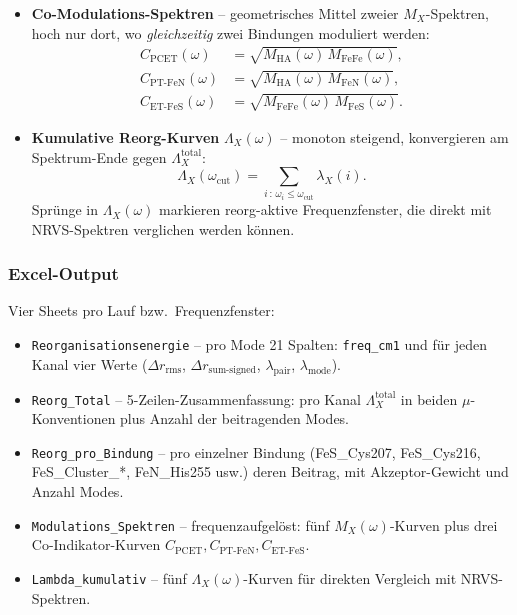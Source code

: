 \documentclass[11pt,a4paper,twoside]{article}
\theoremstyle{remark}
\begin{document}
\begin{itemize}
  \item \textbf{Co-Modulations-Spektren} -- geometrisches Mittel
        zweier $M_X$-Spektren, hoch nur dort, wo \emph{gleichzeitig}
        zwei Bindungen moduliert werden:
        \begin{align}
          C_\text{PCET}(\omega) &= \sqrt{M_\text{HA}(\omega)\, M_\text{FeFe}(\omega)},\\
          C_{\text{PT-FeN}}(\omega) &= \sqrt{M_\text{HA}(\omega)\, M_\text{FeN}(\omega)},\\
          C_{\text{ET-FeS}}(\omega) &= \sqrt{M_\text{FeFe}(\omega)\, M_\text{FeS}(\omega)}.
        \end{align}

  \item \textbf{Kumulative Reorg-Kurven} $\Lambda_X(\omega)$ -- monoton
        steigend, konvergieren am Spektrum-Ende gegen $\Lambda_X^\text{total}$:
        \begin{equation}
          \Lambda_X(\omega_\text{cut})
          = \sum_{i\,:\,\omega_i \le \omega_\text{cut}} \lambda_X(i).
        \end{equation}
        Spr\"unge in $\Lambda_X(\omega)$ markieren reorg-aktive
        Frequenzfenster, die direkt mit NRVS-Spektren verglichen
        werden k\"onnen.
\end{itemize}

\subsubsection*{Excel-Output}
\label{sec:reorg-excel}

Vier Sheets pro Lauf bzw.\ Frequenzfenster:

\begin{itemize}
  \item \texttt{Reorganisationsenergie} -- pro Mode 21 Spalten:
        \texttt{freq\_cm1} und f\"ur jeden Kanal vier Werte
        ($\Delta r_\text{rms}$, $\Delta r_\text{sum-signed}$,
        $\lambda_\text{pair}$, $\lambda_\text{mode}$).

  \item \texttt{Reorg\_Total} -- 5-Zeilen-Zusammenfassung: pro Kanal
        $\Lambda_X^\text{total}$ in beiden $\mu$-Konventionen plus
        Anzahl der beitragenden Modes.

  \item \texttt{Reorg\_pro\_Bindung} -- pro einzelner Bindung
        (FeS\_Cys207, FeS\_Cys216, FeS\_Cluster\_*, FeN\_His255 usw.)
        deren Beitrag, mit Akzeptor-Gewicht und Anzahl Modes.

  \item \texttt{Modulations\_Spektren} -- frequenzaufgel\"ost: f\"unf
        $M_X(\omega)$-Kurven plus drei Co-Indikator-Kurven
        $C_\text{PCET}, C_\text{PT-FeN}, C_\text{ET-FeS}$.

  \item \texttt{Lambda\_kumulativ} -- f\"unf $\Lambda_X(\omega)$-Kurven
        f\"ur direkten Vergleich mit NRVS-Spektren.
\end{itemize}
\end{document}

